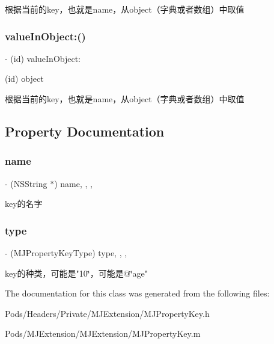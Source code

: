 根据当前的key，也就是name，从object（字典或者数组）中取值 \mbox{\label{interface_m_j_property_key_a7febfc473835f5d17bf904f7c2b05c1c}} 
\subsubsection{\texorpdfstring{value\+In\+Object\+:()}{valueInObject:()}\hspace{0.1cm}{\footnotesize\ttfamily [3/3]}}
{\footnotesize\ttfamily -\/ (id) value\+In\+Object\+: \begin{DoxyParamCaption}\item[{(id)}]{object }\end{DoxyParamCaption}}

根据当前的key，也就是name，从object（字典或者数组）中取值 

\subsection{Property Documentation}
\mbox{\label{interface_m_j_property_key_a63ca0c12601b49ec60958588c0685774}} 
\subsubsection{\texorpdfstring{name}{name}}
{\footnotesize\ttfamily -\/ (N\+S\+String $\ast$) name\hspace{0.3cm}{\ttfamily [read]}, {\ttfamily [write]}, {\ttfamily [nonatomic]}, {\ttfamily [copy]}}

key的名字 \mbox{\label{interface_m_j_property_key_acb6050c50cd0811ec029ea8450222700}} 
\subsubsection{\texorpdfstring{type}{type}}
{\footnotesize\ttfamily -\/ (M\+J\+Property\+Key\+Type) type\hspace{0.3cm}{\ttfamily [read]}, {\ttfamily [write]}, {\ttfamily [nonatomic]}, {\ttfamily [assign]}}

key的种类，可能是"10\char`\"{}，可能是@\char`\"{}age" 

The documentation for this class was generated from the following files\+:\begin{DoxyCompactItemize}
\item 
Pods/\+Headers/\+Private/\+M\+J\+Extension/M\+J\+Property\+Key.\+h\item 
Pods/\+M\+J\+Extension/\+M\+J\+Extension/M\+J\+Property\+Key.\+m\end{DoxyCompactItemize}
